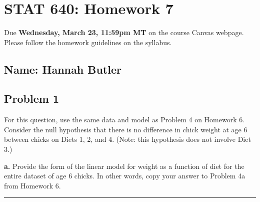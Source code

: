 \documentclass[
]{article}
\author{}
\date{\vspace{-2.5em}}
\begin{document}
\hypertarget{stat-640-homework-7}{%
\section{STAT 640: Homework 7}\label{stat-640-homework-7}}

Due \textbf{Wednesday, March 23, 11:59pm MT} on the course Canvas
webpage. Please follow the homework guidelines on the syllabus.

\hypertarget{name-hannah-butler}{%
\subsection{Name: Hannah Butler}\label{name-hannah-butler}}

\hypertarget{section}{%
\subsection{}\label{section}}

\hypertarget{problem-1}{%
\subsection{Problem 1}\label{problem-1}}

For this question, use the same data and model as Problem 4 on Homework
6. Consider the null hypothesis that there is no difference in chick
weight at age 6 between chicks on Diets 1, 2, and 4. (Note: this
hypothesis does not involve Diet 3.)

\textbf{a.} Provide the form of the linear model for weight as a
function of diet for the entire dataset of age 6 chicks. In other words,
copy your answer to Problem 4a from Homework 6.

\begin{center}\rule{0.5\linewidth}{0.5pt}\end{center}
\end{document}
